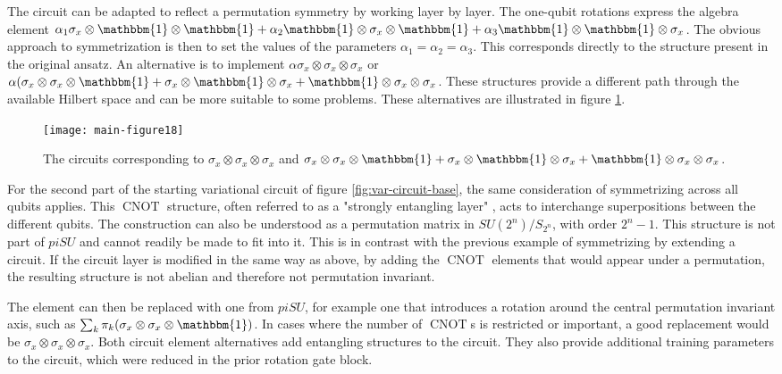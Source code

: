 \documentclass[%
 reprint,
 amsmath,amssymb,
 aps,
]{revtex4-2}
\newcommand{\CNOT}{\operatorname{CNOT}}
\theoremstyle{definition}%
\begin{document}
The circuit can be adapted to reflect a permutation symmetry by working layer by layer. The one-qubit rotations express the algebra element $\alpha_1\sigma_{x} \otimes \mathbbm{1} \otimes \mathbbm{1} + \alpha_2 \mathbbm{1} \otimes \sigma_{x} \otimes \mathbbm{1} + \alpha_3 \mathbbm{1} \otimes \mathbbm{1} \otimes \sigma_{x}$. The obvious approach to symmetrization is then to set the values of the parameters $\alpha_1 = \alpha_2 = \alpha_3$. This corresponds directly to the structure present in the original ansatz. An alternative is to implement $\alpha \sigma_x \otimes \sigma_x \otimes \sigma_x$ or $\alpha (\sigma_x \otimes \sigma_x \otimes \mathbbm{1} + \sigma_x \otimes \mathbbm{1} \otimes \sigma_x + \mathbbm{1} \otimes \sigma_x \otimes \sigma_x$. These structures provide a different path through the available Hilbert space and can be more suitable to some problems. These alternatives are illustrated in figure \ref{fig:xx1-xxx}.

\begin{figure}
    \centering
\texttt{[image: main-figure18]}
    \caption{The circuits corresponding to $\sigma_x \otimes \sigma_x \otimes \sigma_x$ and $\sigma_x \otimes \sigma_x \otimes \mathbbm{1} + \sigma_x \otimes \mathbbm{1} \otimes \sigma_x + \mathbbm{1} \otimes \sigma_x \otimes \sigma_x$. }
    \label{fig:xx1-xxx}
\end{figure}

For the second part of the starting variational circuit of figure \ref{fig:var-circuit-base}, the same consideration of symmetrizing across all qubits applies. This $\CNOT$ structure, often referred to as a "strongly entangling layer" \cite{bergholm_pennylane_2022}, acts to interchange superpositions between the different qubits. The construction can also be understood as a permutation matrix in $SU(2^n)/S_{2^n}$, with order $2^n-1$. This structure is not part of $piSU$ and cannot readily be made to fit into it. This is in contrast with the previous example of symmetrizing by extending a circuit. If the circuit layer is modified in the same way as above, by adding the $\CNOT$ elements that would appear under a permutation, the resulting structure is not abelian and therefore not permutation invariant.

The element can then be replaced with one from $piSU$, for example one that introduces a rotation around the central permutation invariant axis, such as $\sum_k\pi_k(\sigma_x \otimes \sigma_x \otimes \mathbbm{1})$. In cases where the number of $\CNOT$s is restricted or important, a good replacement would be $\sigma_x \otimes \sigma_x \otimes \sigma_x$. Both circuit element alternatives add entangling structures to the circuit. They also provide additional training parameters to the circuit, which were reduced in the prior rotation gate block.
\end{document}
